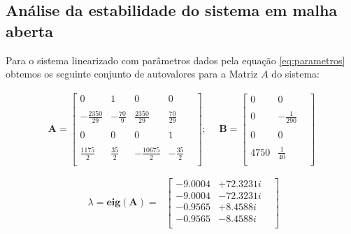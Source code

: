 \documentclass[a4paper]{ifacconf}
\begin{document}
        \subsection{Análise da estabilidade do sistema em malha aberta}
    
    Para o sistema linearizado com parâmetros dados pela equação \ref{eq:parametros} obtemos os seguinte conjunto de autovalores para a Matriz $A$ do sistema:
    
    \begin{equation}
    \begin{split}
    \mathbf{A} =
        \begin{bmatrix}
               0&      1&        0&     0&\\ \\
               -\frac{2350}{29}& -\frac{70}{9}&  \frac{2350}{29}& \frac{70}{29}&\\ \\
               0&      0&        0&     1&\\ \\
                \frac{1175}{2}&   \frac{35}{2}& -\frac{10675}{2}& -\frac{35}{2}&\\ 
        \end{bmatrix}; \ \
    \end{split}
   \begin{split}
   \mathbf{B} =
        \begin{bmatrix}
               0&      0&\\ \\
               0& -\frac{1}{290}&\\ \\
               0&      0&\\ \\
            4750&   \frac{1}{40}&\\
        \end{bmatrix}
   \end{split}     
    \end{equation}
    
    \begin{equation} \label{eq:autovalores}
        \begin{split}
             \lambda=\mathbf{eig(A)}=\
        \end{split}
        \begin{bmatrix}
            -9.0004& +72.3231i&\\
            -9.0004& -72.3231i&\\
            -0.9565& + 8.4588i&\\
            -0.9565& - 8.4588i&\\
        \end{bmatrix}
    \end{equation}
        
\end{document}
